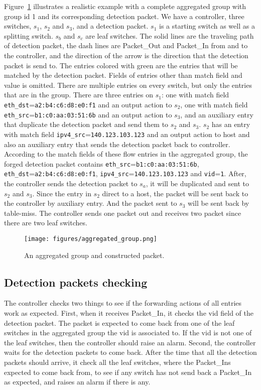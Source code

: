 Figure~\ref{aggregated_group} illustrates a realistic example with a complete aggregated group with group id 1 and its corresponding detection packet. We have a controller, three switches, $s_1$, $s_2$ and $s_3$, and a detection packet. $s_1$ is a starting switch as well as a splitting switch. $s_b$ and $s_c$ are leaf switches. The solid lines are the traveling path of detection packet, the dash lines are Packet\_Out and Packet\_In from and to the controller, and the direction of the arrow is the direction that the detection packet is send to. The entries colored with green are the entries that will be matched by the detection packet. Fields of entries other than match field and value is omitted. There are multiple entries on every switch, but only the entries that are in the group. There are three entries on $s_1$: one with match field \texttt{eth\_dst}=\texttt{a2:b4:c6:d8:e0:f1} and an output action to $s_2$, one with match field \texttt{eth\_src}=\texttt{b1:c0:aa:03:51:6b} and an output action to $s_3$, and an auxiliary entry that duplicate the detection packet and send them to $s_2$ and $s_3$. $s_2$ has an entry with match field \texttt{ipv4\_src}=\texttt{140.123.103.123} and an output action to host and also an auxiliary entry that sends the detection packet back to controller. According to the match fields of these flow entries in the aggregated group, the forged detection packet contains \texttt{eth\_src}=\texttt{b1:c0:aa:03:51:6b}, \texttt{eth\_dst}=\texttt{a2:b4:c6:d8:e0:f1}, \texttt{ipv4\_src}=\texttt{140.123.103.123} and \texttt{vid}=\texttt{1}. After, the controller sends the detection packet to $s_a$, it will be duplicated and sent to $s_2$ and $s_3$. Since the entry in $s_2$ direct to a host, the packet will be sent back to the controller by auxiliary entry. And the packet sent to $s_3$ will be sent back by table-miss. The controller sends one packet out and receives two packet since there are two leaf switches.

\begin{figure}[H]
\begin{center}
\texttt{[image: figures/aggregated\_group.png]}
\end{center}
\caption{An aggregated group and constructed packet. }
\label{aggregated_group}
\end{figure}

\subsection{Detection packets checking}
The controller checks two things to see if the forwarding actions of all entries work as expected. First, when it receives Packet\_In, it checks the vid field of the detection packet. The packet is expected to come back from one of the leaf switches in the aggregated group the vid is associated to. If the vid is not one of the leaf switches, then the controller should raise an alarm. Second, the controller waits for the detection packets to come back. After the time that all the detection packets should arrive, it check all the leaf switches, where the Packet\_Ins expected to come back from, to see if any switch has not send back a Packet\_In as expected, and raises an alarm if there is any. 

